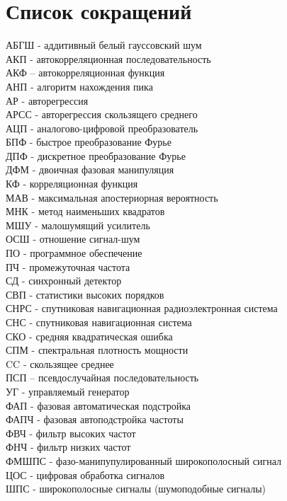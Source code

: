 \chapter*{Список сокращений}
\noindent
АБГШ - аддитивный белый гауссовский шум				\\
АКП - автокорреляционная последовательность			\\
АКФ – автокорреляционная функция				\\
АНП - алгоритм нахождения пика					\\
АР - авторегрессия						\\
АРСС - авторегрессия скользящего среднего			\\
АЦП - аналогово-цифровой преобразователь			\\
БПФ - быстрое преобразование Фурье				\\
ДПФ - дискретное преобразование Фурье				\\
ДФМ - двоичная фазовая манипуляция				\\
КФ - корреляционная функция					\\
МАВ - максимальная апостериорная вероятность			\\
МНК - метод наименьших квадратов				\\
МШУ - малошумящий усилитель					\\
ОСШ - отношение сигнал-шум 					\\
ПО - программное обеспечение					\\
ПЧ - промежуточная частота					\\
СД - синхронный детектор					\\
СВП - статистики высоких порядков				\\
СНРС - спутниковая навигационная радиоэлектронная система	\\
СНС - спутниковая навигационная система				\\
СКО - средняя квадратическая ошибка				\\
СПМ - спектральная плотность мощности				\\
CC - скользящее среднее						\\
ПСП – псевдослучайная последовательность			\\
УГ - управляемый генератор					\\
ФАП - фазовая автоматическая подстройка				\\
ФАПЧ - фазовая автоподстройка частоты				\\
ФВЧ - фильтр высоких частот					\\
ФНЧ - фильтр низких частот					\\
ФМШПС - фазо-манипупулированный широкополосный сигнал		\\
ЦОС - цифровая обработка сигналов				\\
ШПС -  широкополосные сигналы (шумоподобные сигналы)		\\


